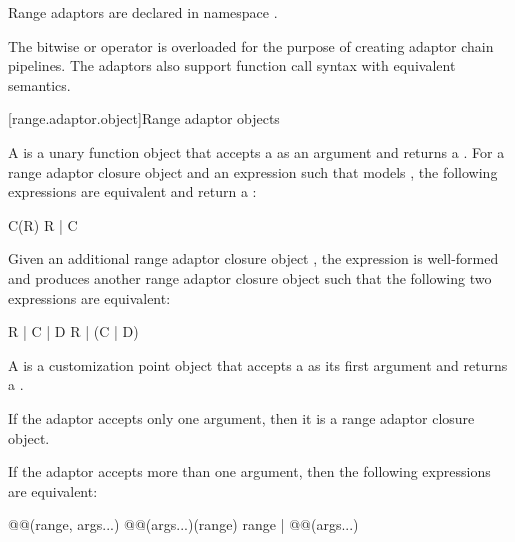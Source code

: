 \begin{addedblock}
\pnum
Range adaptors are declared in namespace .

\pnum
The bitwise or operator is overloaded for the purpose of creating adaptor chain
pipelines. The adaptors also support function call syntax with equivalent
semantics.

\pnum
\begin{example}
\end{example}

[range.adaptor.object]{Range adaptor objects}

\pnum
A  is a unary function object that accepts
a  as an argument and returns a . For
a range adaptor closure object  and an expression  such that
 models , the following
expressions are equivalent and return a :

\begin{codeblock}
C(R)
R | C
\end{codeblock}

Given an additional range adaptor closure object ,
the expression  is well-formed and produces another range adaptor
closure object such that the following two expressions are equivalent:

\begin{codeblock}
R | C | D
R | (C | D)
\end{codeblock}

\pnum
A  is a
customization point object
that accepts a  as its first argument and returns a
.

\pnum
If the adaptor accepts only one argument, then it is a range adaptor closure
object.

\pnum
If the adaptor accepts more than one argument, then the following expressions
are equivalent:

\begin{codeblock}
@@(range, args...)
@@(args...)(range)
range | @@(args...)
\end{codeblock}


\end{addedblock}
